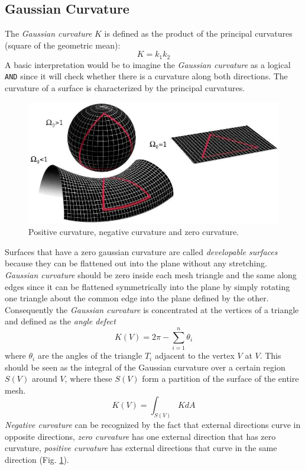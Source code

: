 \subsection{Gaussian Curvature} \label{section:gaussian-curvature-intro}
The \textit{Gaussian curvature} $K$ is defined as the product of the principal curvatures (square of the geometric mean):
$$K=k_1k_2$$
A basic interpretation would be to imagine the \textit{Gaussian curvature} as a logical \texttt{AND} since it will check whether there is a curvature along both directions.
The curvature of a surface is characterized by the principal curvatures.
\cite{WEBSITE:gaussiancurvaturedirty}
\begin{figure}[!h]
  \centering
\includegraphics[scale=0.5]{images/gaussian_curvature_examples.png}
\caption{Positive curvature, negative curvature and zero curvature.}\label{fig:curvature-gaussian}
\end{figure}
Surfaces that have a zero gaussian curvature are called \textit{developable surfaces} because they can be flattened out into the plane without any stretching. \textit{Gaussian curvature} should be zero inside each mesh triangle and the same along edges since it can be flattened symmetrically into the plane by simply rotating one triangle about the common edge into the plane defined by the other. Consequently the \textit{Gaussian curvature} is concentrated at the vertices of a triangle and defined as the \textit{angle defect}
$$K(V) = 2 \pi - \sum_{i=1}^n \theta_i$$
where $\theta_i$ are the angles of the triangle $T_i$ adjacent to the vertex $V$ at $V$. This should be seen as the integral of the Gaussian curvature over a certain region $S(V)$ around $V$, where these $S(V)$ form a partition of the surface of the entire mesh.
$$ K(V) = \int_{S(V)} KdA  $$
\textit{Negative curvature} can be recognized by the fact that external directions curve in opposite directions, \textit{zero curvature} has one external direction that has zero curvature, \textit{positive curvature} has external directions that curve in the same direction (Fig. \ref{fig:curvature-gaussian}).
